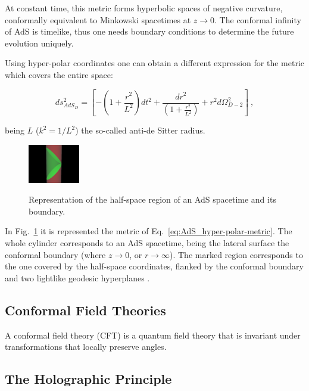 \documentclass[twocolumn]{revtex4}
\providecommand{\eq}[2]{
    \begin{equation}
        #2
    \label{eq:#1}
    \end{equation}
}
\begin{document}
At constant time, \cite{} this metric forms hyperbolic spaces of negative curvature, conformally equivalent to Minkowski spacetimes at $z \to 0$. The conformal infinity of AdS is timelike, thus one needs boundary conditions to determine the future evolution uniquely.

Using hyper-polar coordinates one can obtain a different expression for the metric which covers the entire space:
\eq{AdS_hyper-polar-metric}{
    ds_{AdS_D}^2 = \left [ - \left ( 1 + \frac{r^2}{L^2} \right ) dt^2 + \frac{dr^2}{\left ( 1+ \frac{r^2}{L^2} \right )} + r^2 d \Omega_{D-2}^2 \right ] \ ,
}
being $L$ ($k^2=1/L^2$) the so-called anti-de Sitter radius.

\begin{figure}
    \centering
    \includegraphics[width=0.2\textwidth]{../Imatges/Extern/Wikipedia_Half-space_Cilindric.png}
\label{fig:AdS_cylindrical}
\caption{Representation of the half-space region of an AdS spacetime and its boundary.}
\end{figure}

In Fig.~\ref{fig:AdS_cylindrical} it is represented the metric of Eq.~\ref{eq:AdS_hyper-polar-metric}. The whole cylinder corresponds to an AdS spacetime, being the lateral surface the conformal boundary (where $z \to 0$, or $r \to \infty$). The marked region corresponds to the one covered by the half-space coordinates, flanked by the conformal boundary and two lightlike geodesic hyperplanes \cite{}.


\subsection{Conformal Field Theories} \label{ss:CFT}

A conformal field theory (CFT) is a quantum field theory that is invariant under transformations that locally preserve angles.


\subsection{The Holographic Principle} \label{ss:Holography}
\end{document}
